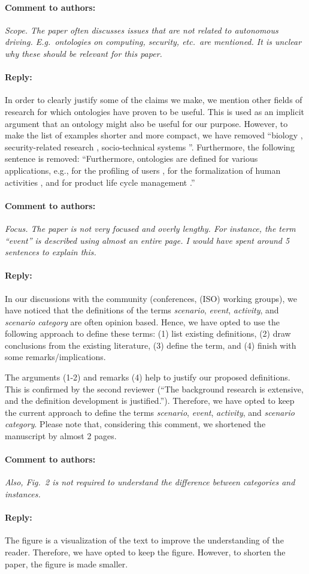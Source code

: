 \documentclass[10pt,final,a4paper,oneside,onecolumn]{article}
\newcommand{\toauthor}{\paragraph*{Comment to authors:} \itshape}
\newcommand{\fromauthor}{\paragraph*{Reply:} \normalfont}
\begin{document}
\toauthor Scope. The paper often discusses issues that are not related to autonomous driving. E.g.\ ontologies on computing, security, etc.\ are mentioned. It is unclear why these should be relevant for this paper.

\fromauthor In order to clearly justify some of the claims we make, we mention other fields of research for which ontologies have proven to be useful. This is used as an implicit argument that an ontology might also be useful for our purpose. However, to make the list of examples shorter and more compact, we have removed ``biology \autocite{gkoutos2004mouse}, security-related research \autocite{kim2005security}, socio-technical systems \autocite{vanDamPhDThesis2009}''. Furthermore, the following sentence is removed: ``Furthermore, ontologies are defined for various applications, e.g., for the profiling of users \autocite{golemati2007creating}, for the formalization of human activities \autocite{lee2017location}, and for product life cycle management \autocite{matsokis2010plm}.''



\toauthor Focus. The paper is not very focused and overly lengthy. For instance, the term ``event'' is described using almost an entire page. I would have spent around 5 sentences to explain this.  

\fromauthor  In our discussions with the community (conferences, (ISO) working groups), we have noticed that the definitions of the terms \emph{scenario}, \emph{event}, \emph{activity}, and \emph{scenario category} are often opinion based. Hence, we have opted to use the following approach to define these terms: (1) list existing definitions, (2) draw conclusions from the existing literature, (3) define the term, and (4) finish with some remarks/implications. 

The arguments (1-2) and remarks (4) help to justify our proposed definitions. This is confirmed by the second reviewer (``The background research is extensive, and the definition development is justified.''). Therefore, we have opted to keep the current approach to define the terms \emph{scenario}, \emph{event}, \emph{activity}, and \emph{scenario category}. Please note that, considering this comment, we shortened the manuscript by almost 2 pages.



\toauthor Also, Fig.~2 is not required to understand the difference between categories and instances. 

\fromauthor The figure is a visualization of the text to improve the understanding of the reader. Therefore, we have opted to keep the figure. However, to shorten the paper, the figure is made smaller.
\end{document}
